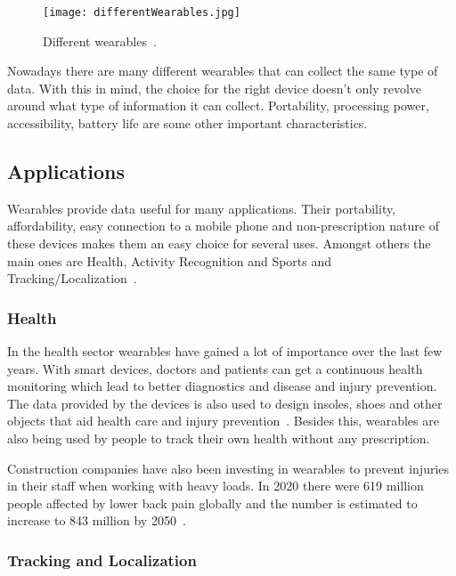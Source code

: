 \begin{figure}[htbp]
    \centering
    \texttt{[image: differentWearables.jpg]}
    \caption{Different wearables~\cite{wearablesAndIOT}.}
    \label{fig:difWearables}
\end{figure}

Nowadays there are many different wearables that can collect the same type of data. With this in mind, the choice for the right device doesn't only revolve around what type of information 
it can collect. Portability, processing power, accessibility, battery life are some other important characteristics.


\subsection{Applications}
\label{sub:aplications}

Wearables provide data useful for many applications. Their portability, affordability, easy connection to a mobile phone and non-prescription nature of these devices
 makes them an easy choice for several uses. Amongst others the main ones are Health, Activity Recognition and Sports and Tracking/Localization~\cite{wearablesAndIOT}. 

\subsubsection{Health}
\label{ssub:health}

In the health sector wearables have gained a lot of importance over the last few years. With smart devices, doctors and patients can get a continuous health monitoring which lead to better diagnostics and disease and injury prevention. 
The data provided by the devices is also used to design insoles, shoes and other objects that aid health care and injury prevention~\cite{injuryWalking}.
Besides this, wearables are also being used by people to track their own health without any prescription. 

Construction companies have also been investing in wearables to prevent injuries in their staff when working with heavy loads. In 2020 there were 619 million people affected by lower 
back pain globally and the number is estimated to increase to 843 million by 2050~\cite{lowerBack}.


\subsubsection{Tracking and Localization}
\label{ssub:trackingAndLocalization}

